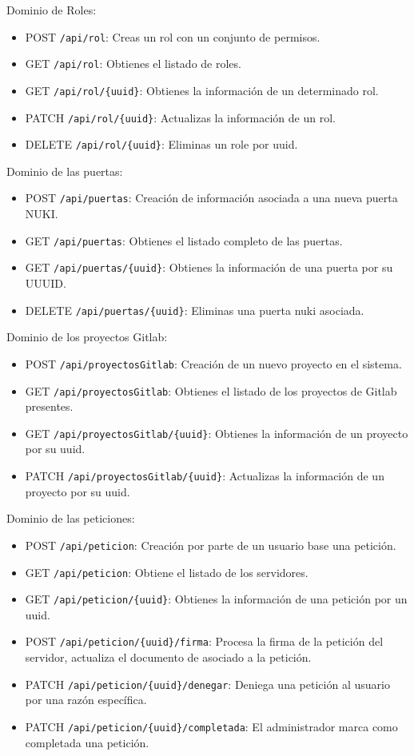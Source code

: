 Dominio de Roles:

\begin{itemize}
  \item POST \texttt{/api/rol}: Creas un rol con un conjunto de permisos.
  \item GET \texttt{/api/rol}: Obtienes el listado de roles.
  \item GET \texttt{/api/rol/\{uuid\}}: Obtienes la información de un determinado rol.
  \item PATCH \texttt{/api/rol/\{uuid\}}: Actualizas la información de un rol.
  \item DELETE \texttt{/api/rol/\{uuid\}}: Eliminas un role por uuid.
\end{itemize}

Dominio de las puertas:

\begin{itemize}
  \item POST \texttt{/api/puertas}: Creación de información asociada a una nueva puerta NUKI.
  \item GET \texttt{/api/puertas}: Obtienes el listado completo de las puertas. 
  \item GET \texttt{/api/puertas/\{uuid\}}: Obtienes la información de una puerta por su UUUID.
  \item DELETE \texttt{/api/puertas/\{uuid\}}: Eliminas una puerta nuki asociada.
\end{itemize}

Dominio de los proyectos Gitlab: 
\begin{itemize}
  \item POST \texttt{/api/proyectosGitlab}: Creación de un nuevo proyecto en el sistema.
  \item GET \texttt{/api/proyectosGitlab}: Obtienes el listado de los proyectos de Gitlab presentes.
  \item GET \texttt{/api/proyectosGitlab/\{uuid\}}: Obtienes la información de un proyecto por su uuid.
  \item PATCH \texttt{/api/proyectosGitlab/\{uuid\}}: Actualizas la información de un proyecto por su uuid. 
\end{itemize}

Dominio de las peticiones: 

\begin{itemize}
  \item POST \texttt{/api/peticion}: Creación por parte de un usuario base una petición. 
  \item GET \texttt{/api/peticion}: Obtiene el listado de los servidores. 
  \item GET \texttt{/api/peticion/\{uuid\}}: Obtienes la información de una petición por un uuid. 
  \item POST \texttt{/api/peticion/\{uuid\}/firma}: Procesa la firma de la petición del servidor, actualiza el documento de asociado a la petición. 
  \item PATCH \texttt{/api/peticion/\{uuid\}/denegar}: Deniega una petición al usuario por una razón específica. 
  \item PATCH \texttt{/api/peticion/\{uuid\}/completada}: El administrador marca como completada una petición.
\end{itemize}

